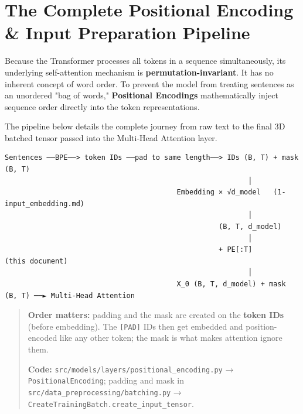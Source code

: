 \documentclass[11pt,a4paper,oneside]{report}
\begin{document}

\chapter{The Complete Positional Encoding \& Input Preparation Pipeline}\label{the-complete-positional-encoding--input-preparation-pipeline}

Because the Transformer processes all tokens in a sequence simultaneously, its underlying self-attention mechanism is \textbf{permutation-invariant}. It has no inherent concept of word order. To prevent the model from treating sentences as an unordered "bag of words," \textbf{Positional Encodings} mathematically inject sequence order directly into the token representations.

The pipeline below details the complete journey from raw text to the final 3D batched tensor passed into the Multi-Head Attention layer.

\begin{Verbatim}[fontsize=\footnotesize]
 Sentences ──BPE──> token IDs ──pad to same length──> IDs (B, T) + mask (B, T)
                                                          │
                                         Embedding × √d_model   (1-input_embedding.md)
                                                          │
                                                   (B, T, d_model)
                                                          │
                                                   + PE[:T]        (this document)
                                                          │
                                         X_0 (B, T, d_model) + mask (B, T) ──► Multi-Head Attention
\end{Verbatim}

\begin{quote}
\textbf{Order matters:} padding and the mask are created on the \textbf{token IDs} (before embedding). The \texttt{{[}PAD{]}} IDs then get embedded and position-encoded like any other token; the mask is what makes attention ignore them.

\textbf{Code:} \texttt{src/\allowbreak{}models/\allowbreak{}layers/\allowbreak{}positional\_\allowbreak{}encoding.\allowbreak{}py} → \texttt{PositionalEncoding}; padding and mask in \texttt{src/\allowbreak{}data\_\allowbreak{}preprocessing/\allowbreak{}batching.\allowbreak{}py} → \texttt{CreateTrainingBatch.\allowbreak{}create\_\allowbreak{}input\_\allowbreak{}tensor}.
\end{quote}
\end{document}
